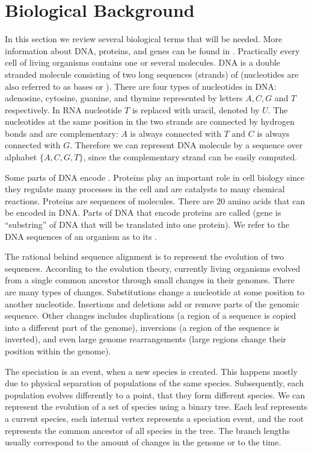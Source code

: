 \section{Biological Background}\label{SECTION:BIOINTRO}

In this section we review several biological terms that will be needed. More
information about DNA, proteins, and genes can be found in
\cite{BiologyForDummies, UnderstandingBioinformatics}. Practically every cell of living
organisms contains one or several  molecules. DNA is a double
stranded molecule consisting of two long sequences (strands) of
 (nucleotides are also referred to as bases or
). There are four types of nucleotides in DNA: adenosine,
cytosine, guanine, and thymine represented by letters $A,C,G$ and $T$
respectively. In RNA nucleotide $T$ is replaced with uracil, denoted by $U$.
The nucleotides at the same position in
the two strands are connected by hydrogen bonds and are complementary: $A$ is
always connected with $T$ and $C$ is always connected with $G$. Therefore we
can represent DNA molecule by a sequence over alphabet $\{A,C,G,T\}$, since the
complementary strand can be easily computed.

Some parts of DNA encode . Proteins play an important role in cell
biology since  they regulate many processes in the cell and are catalysts to
many chemical reactions. Proteins are sequences of 
molecules. There are $20$ amino acids that can be encoded in DNA. Parts of DNA
that encode proteins are called  (gene is ``substring'' of
DNA that will be translated into one protein). We refer to the DNA
sequences of an organism as to its .

The rational behind sequence alignment is to represent the evolution of two
sequences. According to the evolution theory, currently living organisms
evolved from a single common ancestor through small changes in their genomes.
There are many types of changes.  Substitutions change  a nucleotide at some
position to another nucleotide.  Insertions and deletions add or remove parts
of the genomic sequence. Other changes includes duplications (a region of a
sequence is copied into a different part of the genome), inversions (a region
of the sequence is inverted), and even large genome rearrangements (large
regions  change their position within the genome). 

The speciation is an event, when a new species is created. This happens mostly
due to physical separation of populations of the same species. Subsequently, each
population evolves differently to a point, that they form
different species. We can represent the evolution of a set of species using a binary
tree. Each leaf represents a current species, each internal vertex represents
a speciation event, and the root represents the common ancestor of all species in
the tree. The branch lengths usually correspond to the amount of changes in
the genome or to the time. 

